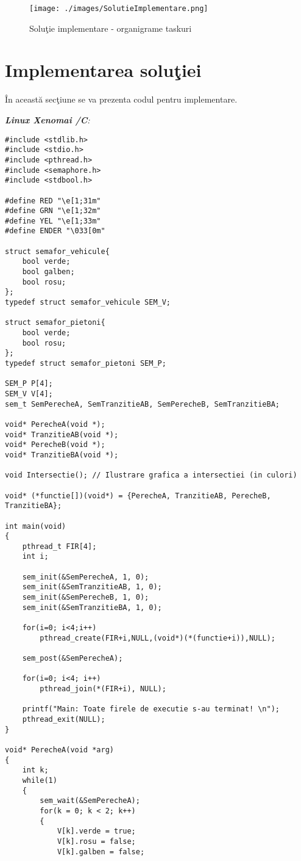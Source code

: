 \documentclass[a4paper, 11pt]{article}
\begin{document}
\begin{figure} [!htb]
\centering
\texttt{[image: ./images/SolutieImplementare.png]}
\caption{\label{fig:taskuri}Solu\c{t}ie implementare - organigrame taskuri}
\end{figure} 


\section{Implementarea solu\c{t}iei}

\^{I}n aceast\u{a} sec\c{t}iune se va prezenta codul pentru implementare. 

\medskip
\medskip

\noindent
{\it \textbf{Linux Xenomai /C}:}
{\small
\begin{verbatim}
#include <stdlib.h>
#include <stdio.h>
#include <pthread.h>
#include <semaphore.h>
#include <stdbool.h>

#define RED "\e[1;31m"
#define GRN "\e[1;32m"
#define YEL "\e[1;33m"
#define ENDER "\033[0m"

struct semafor_vehicule{
	bool verde;
	bool galben;
	bool rosu;
};
typedef struct semafor_vehicule SEM_V;

struct semafor_pietoni{
	bool verde;
	bool rosu;
};
typedef struct semafor_pietoni SEM_P;

SEM_P P[4];
SEM_V V[4];
sem_t SemPerecheA, SemTranzitieAB, SemPerecheB, SemTranzitieBA;

void* PerecheA(void *);
void* TranzitieAB(void *);
void* PerecheB(void *);
void* TranzitieBA(void *);

void Intersectie(); // Ilustrare grafica a intersectiei (in culori)

void* (*functie[])(void*) = {PerecheA, TranzitieAB, PerecheB, TranzitieBA};

int main(void)
{
	pthread_t FIR[4];
	int i;
	
	sem_init(&SemPerecheA, 1, 0);
	sem_init(&SemTranzitieAB, 1, 0);
	sem_init(&SemPerecheB, 1, 0);
	sem_init(&SemTranzitieBA, 1, 0);
	
	for(i=0; i<4;i++)
		pthread_create(FIR+i,NULL,(void*)(*(functie+i)),NULL);
		
	sem_post(&SemPerecheA);
	
	for(i=0; i<4; i++)
		pthread_join(*(FIR+i), NULL);
		
	printf("Main: Toate firele de executie s-au terminat! \n");
	pthread_exit(NULL);
}

void* PerecheA(void *arg)
{
	int k;
	while(1)
	{
		sem_wait(&SemPerecheA);
		for(k = 0; k < 2; k++)
		{
			V[k].verde = true;
			V[k].rosu = false;
			V[k].galben = false;
			

\end{verbatim}}
\end{document}
